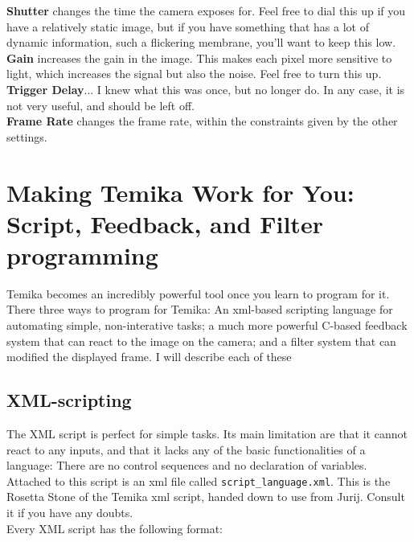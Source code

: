 \documentclass{article}
\begin{document}
\textbf{Shutter} changes the time the camera exposes for. Feel free to dial this up if you have a relatively static image, but if you have something that has a lot of dynamic information, such a flickering membrane, you'll want to keep this low.\\

\textbf{Gain} increases the gain in the image. This makes each pixel more sensitive to light, which increases the signal but also the noise. Feel free to turn this up.\\

\textbf{Trigger Delay}... I knew what this was once, but no longer do. In any case, it is not very useful, and should be left off.\\

\textbf{Frame Rate} changes the frame rate, within the constraints given by the other settings.\\

\newpage

\section{Making Temika Work for You: Script, Feedback, and Filter programming}

Temika becomes an incredibly powerful tool once you learn to program for it. There three ways to program for Temika: An xml-based scripting language for automating simple, non-interative tasks; a much more powerful C-based feedback system that can react to the image on the camera; and a filter system that can modified the displayed frame. I will describe each of these

\subsection{XML-scripting}

The XML script is perfect for simple tasks. Its main limitation are that it cannot react to any inputs, and that it lacks any of the basic functionalities of a language: There are no control sequences and no declaration of variables.\\

Attached to this script is an xml file called \verb|script_language.xml|. This is the Rosetta Stone of the Temika xml script, handed down to use from Jurij. Consult it if you have any doubts.\\

Every XML script has the following format:
\end{document}
